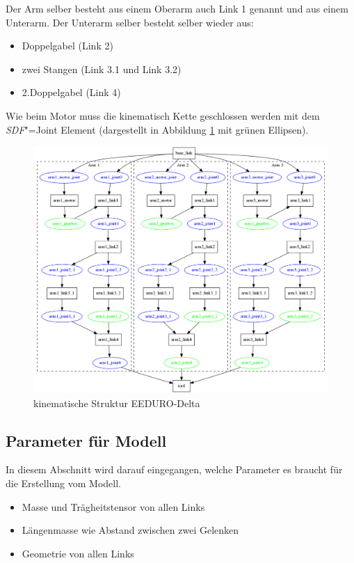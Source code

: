 Der Arm selber besteht aus einem Oberarm auch Link 1 genannt und aus einem Unterarm.
Der Unterarm selber besteht selber wieder aus:
\begin{itemize}
\item Doppelgabel (Link 2)
\item zwei Stangen (Link 3.1 und Link 3.2)
\item 2.Doppelgabel (Link 4)
\end{itemize}


Wie beim Motor muss die kinematisch Kette geschlossen werden mit dem \textit{SDF}"=Joint Element (dargestellt in Abbildung \ref{Ab:delta-struktur} mit grünen Ellipsen).

\begin{figure}[ht!]
	\centering
	\includegraphics[width=14.5cm]{images/delta_struktur.png}
	\caption{kinematische Struktur EEDURO-Delta}
	\label{Ab:delta-struktur}
\end{figure}

\subsection{Parameter für Modell}
In diesem Abschnitt wird darauf eingegangen, welche Parameter es braucht für die Erstellung vom Modell.
\begin{itemize}
\item Masse und Trägheitstensor von allen Links
\item Längenmasse wie Abstand zwischen zwei Gelenken
\item Geometrie von allen Links
\end{itemize}

